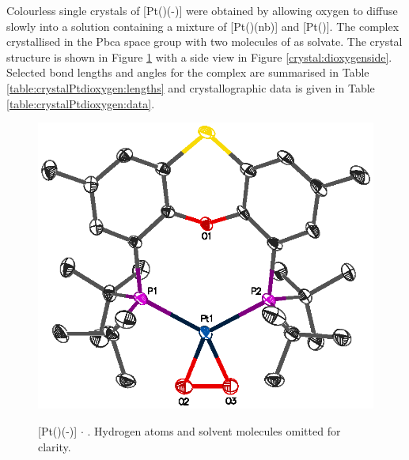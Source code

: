 Colourless single crystals of [Pt(\tButhixantphos)(-)] were obtained by allowing oxygen to diffuse slowly into a  solution containing a mixture of [Pt(\tButhixantphos)(nb)] and [Pt(\tButhixantphos)].  The complex crystallised in the Pbca space group with two molecules of  as solvate.  The crystal structure is shown in Figure \ref{crystal:dioxygen} with a side view in Figure \ref{crystal:dioxygenside}.  Selected bond lengths and angles for the complex are summarised in Table \ref{table:crystalPtdioxygen:lengths} and crystallographic data is given in Table \ref{table:crystalPtdioxygen:data}.  

\begin{figure}[ht]
\begin{center}
\vspace{0.5cm}
\includegraphics{../Figures/Crystalplatinumdioxygen.eps}
\caption[X-ray crystal structure of \texorpdfstring{[Pt(\tButhixantphos)(-){]}} P $\cdot{}$ ]{[Pt(\tButhixantphos)(-)] $\cdot{}$ .  Hydrogen atoms and solvent molecules omitted for clarity.}
\vspace{0.2cm}
\label{crystal:dioxygen}
\end{center}
\end{figure}
\vspace{0.2cm}

